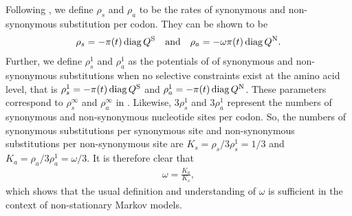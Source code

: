 \documentclass[a4paper,oneside,12pt]{article}
\begin{document}
Following \citet{goldman1994codon}, we define $\rho_s$ and $\rho_a$ to be the rates of synonymous and non-synonymous substitution per codon. They can be shown to be
\begin{align*}
		\rho_s = -\pi(t)\operatorname{diag} Q^\text{S} \quad\text{and}\quad \rho_a = -\omega\pi(t)\operatorname{diag} Q^\text{N}.
\end{align*}
Further, we define $\rho_s^1$ and $\rho_a^1$ as the potentials of of synonymous and non-synonymous substitutions when no selective constraints exist at the amino acid level, that is $\rho_s^1 = -\pi(t)\operatorname{diag} Q^\text{S}$ and $\rho_a^1 = -\pi(t)\operatorname{diag} Q^\text{N}$. These parameters correspond to $\rho_s^\infty$ and $\rho_a^\infty$ in \citet{goldman1994codon}. Likewise, $3\rho_s^1$ and $3\rho_a^1$ represent the numbers of synonymous and non-synonymous nucleotide sites per codon. So, the numbers of synonymous substitutions per synonymous site and non-synonymous substitutions per non-synonymous site are $K_s = \rho_s/3\rho_s^1 = 1/3$ and $K_a=\rho_a/3\rho_a^1 = \omega/3$. It is therefore clear that
\begin{align*}
		\omega = \frac{K_a}{K_s},
\end{align*}
which shows that the usual definition and understanding of $\omega$ is sufficient in the context of non-stationary Markov models.



\end{document}
